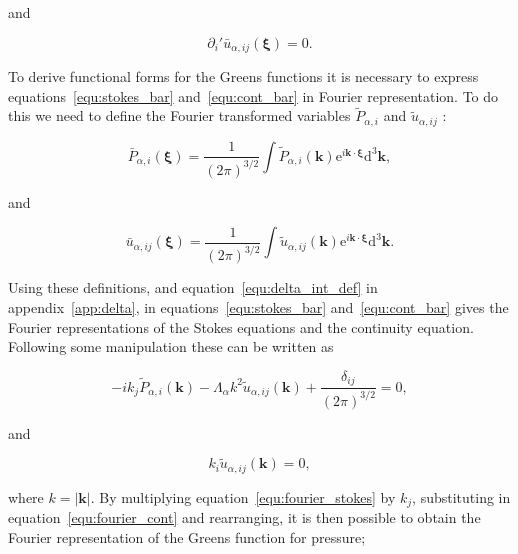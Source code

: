 \documentclass[12pt]{article}
\begin{document}
and

\begin{equation}
\label{equ:cont_bar}
\partial_{i}' \bar{u}_{\alpha,ij} (\boldsymbol\xi)  = 0 .
\end{equation}


To derive functional forms for the Greens functions it is necessary to express equations~\ref{equ:stokes_bar} and~\ref{equ:cont_bar} in Fourier representation. To do this we need to define the Fourier transformed variables $\tilde{P}_{\alpha, i}$ and $\tilde{u}_{\alpha,ij}$ \cite{Riley06}:

\begin{equation}
\label{equ:fourier_p}
\bar{P}_{\alpha, i} (\boldsymbol\xi) = \frac{1}{(2 \pi)^{3/2}} \int \tilde{P}_{\alpha, i} (\boldsymbol{k}) \mathrm{e}^{i \boldsymbol{k} \cdot \boldsymbol\xi} \mathrm{d}^{3} \boldsymbol{k} ,
\end{equation}

and 

\begin{equation}
\label{equ:fourier_vel}
\bar{u}_{\alpha,ij} (\boldsymbol\xi) = \frac{1}{(2 \pi)^{3/2}} \int \tilde{u}_{\alpha,ij} (\boldsymbol{k}) \mathrm{e}^{i \boldsymbol{k} \cdot \boldsymbol\xi} \mathrm{d}^{3} \boldsymbol{k} .
\end{equation}


Using these definitions, and equation~\ref{equ:delta_int_def} in appendix~\ref{app:delta}, in equations~\ref{equ:stokes_bar} and~\ref{equ:cont_bar} gives the Fourier representations of the Stokes equations and the continuity equation. Following some manipulation these can be written as

\begin{equation}
\label{equ:fourier_stokes}
-i k_{j} \tilde{P}_{\alpha, i} (\boldsymbol{k}) - \Lambda_{\alpha} k^{2} \tilde{u}_{\alpha,ij} (\boldsymbol{k}) + \frac{\delta_{ij}}{(2 \pi)^{3/2}} = 0 ,
\end{equation}

and 

\begin{equation}
\label{equ:fourier_cont}
k_{i} \tilde{u}_{\alpha,ij} (\boldsymbol{k}) = 0 ,
\end{equation}

where $k = |\boldsymbol{k}|$. By multiplying equation~\ref{equ:fourier_stokes} by $k_{j}$, substituting in equation~\ref{equ:fourier_cont} and rearranging, it is then possible to obtain the Fourier representation of the Greens function for pressure;
\end{document}
